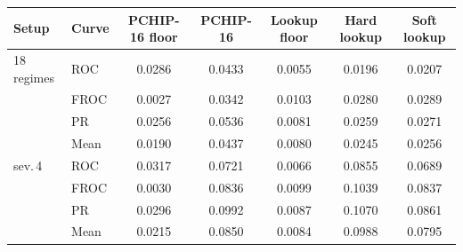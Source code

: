 \begin{tabular}{llccccc}
\toprule
Setup & Curve & PCHIP-16 floor & PCHIP-16 & Lookup floor & Hard lookup & Soft lookup \\
\midrule
18 regimes & ROC & 0.0286 & 0.0433 & 0.0055 & 0.0196 & 0.0207 \\
 & FROC & 0.0027 & 0.0342 & 0.0103 & 0.0280 & 0.0289 \\
 & PR & 0.0256 & 0.0536 & 0.0081 & 0.0259 & 0.0271 \\
 & Mean & 0.0190 & 0.0437 & 0.0080 & 0.0245 & 0.0256 \\
\midrule
sev.\,4 & ROC & 0.0317 & 0.0721 & 0.0066 & 0.0855 & 0.0689 \\
 & FROC & 0.0030 & 0.0836 & 0.0099 & 0.1039 & 0.0837 \\
 & PR & 0.0296 & 0.0992 & 0.0087 & 0.1070 & 0.0861 \\
 & Mean & 0.0215 & 0.0850 & 0.0084 & 0.0988 & 0.0795 \\
\bottomrule
\end{tabular}
